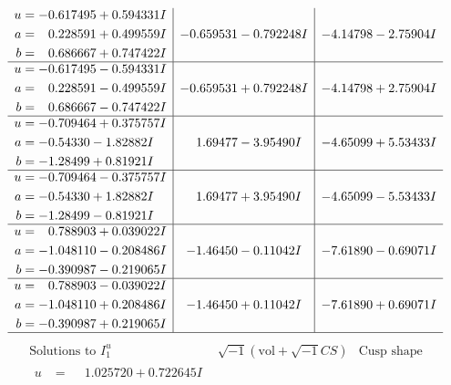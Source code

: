 \documentclass[1p]{elsarticle_modified}
\theoremstyle{definition}
\newcommand{\I}{\sqrt{-1}}
\begin{document}
$$\begin{array}{c|c|c}
\begin{aligned}
u &= -0.617495 + 0.594331 I \\
a &= \phantom{-}0.228591 + 0.499559 I \\
b &= \phantom{-}0.686667 + 0.747422 I\end{aligned}
 & -0.659531 - 0.792248 I & -4.14798 - 2.75904 I \\ \hline\begin{aligned}
u &= -0.617495 - 0.594331 I \\
a &= \phantom{-}0.228591 - 0.499559 I \\
b &= \phantom{-}0.686667 - 0.747422 I\end{aligned}
 & -0.659531 + 0.792248 I & -4.14798 + 2.75904 I \\ \hline\begin{aligned}
u &= -0.709464 + 0.375757 I \\
a &= -0.54330 - 1.82882 I \\
b &= -1.28499 + 0.81921 I\end{aligned}
 & \phantom{-}1.69477 - 3.95490 I & -4.65099 + 5.53433 I \\ \hline\begin{aligned}
u &= -0.709464 - 0.375757 I \\
a &= -0.54330 + 1.82882 I \\
b &= -1.28499 - 0.81921 I\end{aligned}
 & \phantom{-}1.69477 + 3.95490 I & -4.65099 - 5.53433 I \\ \hline\begin{aligned}
u &= \phantom{-}0.788903 + 0.039022 I \\
a &= -1.048110 - 0.208486 I \\
b &= -0.390987 - 0.219065 I\end{aligned}
 & -1.46450 - 0.11042 I & -7.61890 - 0.69071 I \\ \hline\begin{aligned}
u &= \phantom{-}0.788903 - 0.039022 I \\
a &= -1.048110 + 0.208486 I \\
b &= -0.390987 + 0.219065 I\end{aligned}
 & -1.46450 + 0.11042 I & -7.61890 + 0.69071 I\\
 \hline 
 \end{array}$$\newpage$$\begin{array}{c|c|c}  
\text{Solutions to }I^u_{1}& \I (\text{vol} + \sqrt{-1}CS) & \text{Cusp shape}\\
 \hline 
\begin{aligned}
u &= \phantom{-}1.025720 + 0.722645 I \\

\end{aligned}
\end{array}$$
\end{document}
